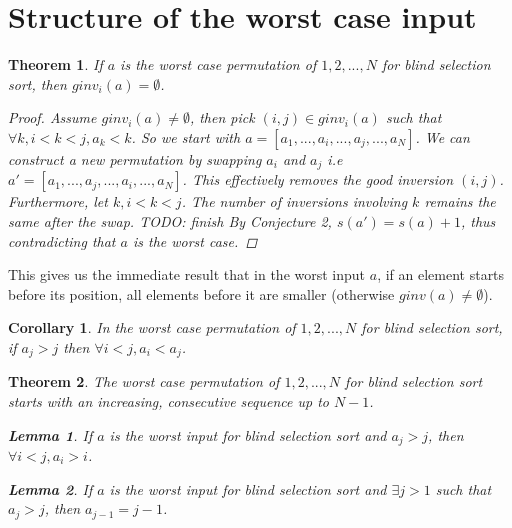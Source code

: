 \documentclass{article}
\newtheorem{lemma}{Lemma}
\newtheorem{theorem}{Theorem}
\newtheorem{corollary}{Corollary}
\begin{document}
\section{Structure of the worst case input}
\begin{theorem}
    If $a$ is the worst case permutation of $1, 2, ..., N$ for blind selection sort, then $ginv_i(a) = \emptyset$.
    \begin{proof}
        Assume $ginv_i(a) \neq \emptyset$, then pick $(i, j) \in ginv_i(a)$ such that $\forall k, i < k < j, a_k < k$.
        So we start with $a = [a_1, ... , a_i, ...,  a_j, ..., a_N]$. We can construct a new permutation by swapping $a_i$ and $a_j$
        i.e $a' = [a_1, ... , a_j, ...,  a_i, ..., a_N]$. This effectively removes the good inversion $(i, j)$.
        Furthermore, let $k, i < k < j$. The number of inversions involving $k$ remains the same after the swap. TODO: finish
        By Conjecture 2, $s(a') = s(a) + 1$, thus contradicting that $a$ is the worst case.
    \end{proof}
\end{theorem}
This gives us the immediate result that in the worst input $a$, if an element starts before its position, all elements before it are smaller (otherwise $ginv(a) \neq \emptyset$).
\begin{corollary}
    In the worst case permutation of $1, 2, ... , N$ for blind selection sort, if $a_j > j$ then $\forall i < j, a_i < a_j$.
\end{corollary}
\begin{theorem}
    The worst case permutation of $1, 2, ..., N$ for blind selection sort starts with an increasing, consecutive sequence up to $N - 1$.
    \begin{lemma}
        If $a$ is the worst input for blind selection sort and $a_j > j$, then $ \forall i < j, a_i > i$.
    \end{lemma}
    \begin{lemma}
        If $a$ is the worst input for blind selection sort and $\exists j > 1$ such that $a_j > j$, then $ a_{j-1} = j - 1$.
    \end{lemma}
\end{theorem}
\end{document}
